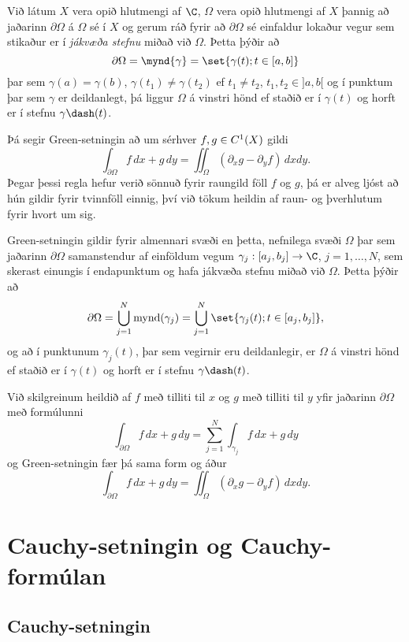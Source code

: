 Við látum $X$ vera opið hlutmengi af $\C$, $\Omega$ vera opið hlutmengi
af $X$ þannig að jaðarinn $\partial\Omega$ á $\Omega$ sé í $X$ og gerum
ráð fyrir  að $\partial\Omega$  sé einfaldur lokaður vegur sem stikaður
er í {\it jákvæða stefnu} miðað við $\Omega$.
Þetta þýðir að 
$$ \partial\Omega=\mynd {\gamma}=\set{\gamma(t); t\in [a,b]} $$
þar sem $\gamma(a)=\gamma(b)$, $\gamma(t_1)\neq \gamma(t_2)$ ef
$t_1\neq t_2$, $t_1,t_2\in ]a,b[$ og í punktum þar sem $\gamma$ er
deildanlegt, þá liggur $\Omega$ á vinstri hönd ef staðið er í 
$\gamma(t)$  og horft er í stefnu $\gamma\dash(t)$.


\noindent Þá segir Green-setningin að um sérhver $f,g\in C\sp 1(X)$ gildi
 $$\int_{\partial\Omega} f\, dx +g \, dy =\iint_\Omega(\partial_x
g-\partial_y f)\, dxdy.
 $$
Þegar þessi regla hefur verið sönnuð fyrir raungild föll $f$ og $g$,
þá er alveg ljóst að hún gildir fyrir tvinnföll einnig, því við tökum
heildin af raun- og þverhlutum fyrir hvort um sig.

Green-setningin  gildir fyrir almennari svæði en þetta, nefnilega svæði
$\Omega$ þar sem jaðarinn $\partial\Omega$ samanstendur af einföldum
vegum $\gamma_j:[a_j,b_j]\to \C$, $j=1,\dots,N$, 
sem skerast einungis í endapunktum og
hafa jákvæða stefnu miðað við $\Omega$.  Þetta þýðir að 
 $$\partial\Omega=\bigcup\limits_{j=1}^N\operatorname{mynd} (\gamma_j)=
\bigcup\limits_{j=1}^N \set{\gamma_j(t); t\in [a_j,b_j]},
 $$
og að í punktunum $\gamma_j(t)$, þar sem vegirnir eru deildanlegir, er
$\Omega$ á vinstri hönd ef staðið er í 
$\gamma(t)$  og horft er í stefnu $\gamma\dash(t)$.


\noindent
Við skilgreinum heildið  af $f$  með
tilliti til $x$ og $g$ með tilliti til $y$ yfir jaðarinn
$\partial\Omega$ með formúlunni
 $$\int_{\partial\Omega}f\, dx + g\, dy =\sum_{j=1}^N \int_{\gamma_j}f
\, dx + g\, dy
 $$
og Green-setningin fær þá sama form og áður
 $$\int_{\partial\Omega}f\, dx+g\, dy =\iint_\Omega
(\partial_xg-\partial_yf)\, dxdy.
 $$


 
\section {Cauchy-setningin og Cauchy-formúlan}

\subsection*{Cauchy-setningin}

